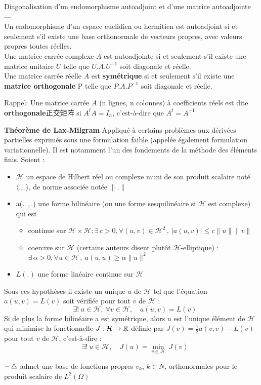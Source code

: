 \begin{theorem}
Diagonalisation d'un endomorphisme autoadjoint et d'une matrice autoadjointe — \\
Un endomorphisme d'un espace euclidien ou hermitien est autoadjoint si et seulement s'il existe une base orthonormale de vecteurs propres, avec valeurs propres toutes r\'eelles.\\
Une matrice carr\'ee complexe $A$ est autoadjointe si et seulement s'il existe une matrice unitaire $U$ telle que $U.A.U^{-1}$ soit diagonale et r\'eelle.\\
Une matrice carr\'ee r\'eelle $A$ est \textbf{sym\'etrique} si et seulement s'il existe une \textbf{matrice orthogonale} P telle que $P.A.P^{-1}$ soit diagonale et r\'eelle.
\end{theorem}
Rappel:
Une matrice carr\'ee $A$ (n lignes, n colonnes) \`a coefficients r\'eels est dite \textbf{orthogonale}正交矩阵 si $A^t A = I_n$, c'est-\`a-dire que $A^t = A^{-1}$

\textbf{Th\'eor\`eme de Lax-Milgram}\newline
Appliqu\'e \`a certains probl\`emes aux d\'eriv\'ees partielles exprim\'es sous une formulation faible (appel\'ee \'egalement formulation variationnelle). Il est notamment l'un des fondements de la m\'ethode des \'el\'ements finis.
Soient :
\begin{itemize}
		\item $\mathcal{H}$ un espace de Hilbert r\'eel ou complexe muni de son produit scalaire not\'e $\langle.,.\rangle$, de norme associ\'ee not\'ee $\|.\|$
		\item a(.\, ,\,.) une forme bilin\'eaire (ou une forme sesquilin\'eaire si $\mathcal{H}$ est complexe) qui est
				\begin{itemize}
						\item continue sur $\mathcal{H}\times\mathcal{H} : \exists\,c>0, \forall (u,v)\in \mathcal{H}^2\,,\ |a(u,v)|\leq c\|u\|\|v\|$
						\item coercive sur $\mathcal{H}$ (certains auteurs disent plut\^ot $\mathcal{H}$-elliptique) : $\exists\,\alpha>0, \forall u\in\mathcal{H}\,,\ a(u,u) \geq \alpha\|u\|^2$
				\end{itemize}
		\item $L(.)$ une forme lin\'eaire continue sur $\mathcal{H}$
\end{itemize}
Sous ces hypoth\`eses il existe un unique $u$ de $\mathcal{H}$ tel que l'\'equation $a(u,v)=L(v)$ soit v\'erifi\'ee pour tout $v$ de $\mathcal{H}$ :
$$
\quad \exists!\ u \in \mathcal{H},\ \forall v\in\mathcal{H},\quad a(u,v)=L(v)
$$
Si de plus la forme bilin\'eaire a est sym\'etrique, alors  $u$  est l'unique \'el\'ement de $\mathcal{H}$ qui minimise la fonctionnelle $J:\mathcal{H}\rightarrow\mathbb{R}$ d\'efinie par $J(v) = \tfrac{1}{2}a(v,v)-L(v)$ pour tout $v$ de $\mathcal{H}$, c'est-\`a-dire :
$$
\quad \exists!\ u \in \mathcal{H},\quad J(u) = \min_{v\in\mathcal{H}}\ J(v)
$$
\bigskip

$-\mathop{}\!\mathbin\bigtriangleup $ admet une base de fonctions propres $v_k$, $k \in N$,
orthonormales pour le produit scalaire de $L^2(\Omega)$
